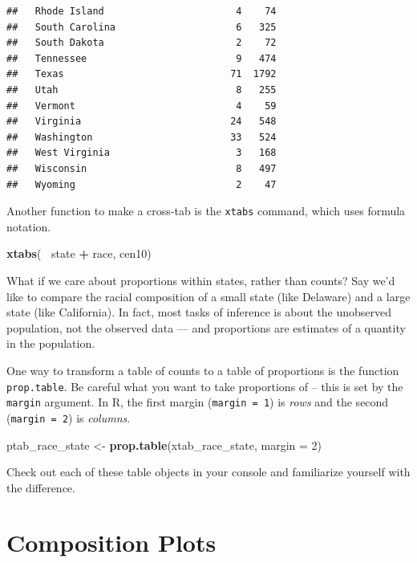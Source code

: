 \documentclass[]{book}
\newenvironment{Shaded}{\begin{snugshade}}{\end{snugshade}}
\newcommand{\DataTypeTok}[1]{\textcolor[rgb]{0.13,0.29,0.53}{#1}}
\newcommand{\DecValTok}[1]{\textcolor[rgb]{0.00,0.00,0.81}{#1}}
\newcommand{\KeywordTok}[1]{\textcolor[rgb]{0.13,0.29,0.53}{\textbf{#1}}}
\newcommand{\NormalTok}[1]{#1}
\newcommand{\OperatorTok}[1]{\textcolor[rgb]{0.81,0.36,0.00}{\textbf{#1}}}
\newcommand{\StringTok}[1]{\textcolor[rgb]{0.31,0.60,0.02}{#1}}
\theoremstyle{definition}
\theoremstyle{definition}
\theoremstyle{definition}
\theoremstyle{remark}
\begin{document}
\begin{Shaded}
\begin{Highlighting}[]
\begin{Shaded}
\begin{Highlighting}[]
\begin{verbatim}
##   Rhode Island                       4    74
##   South Carolina                     6   325
##   South Dakota                       2    72
##   Tennessee                          9   474
##   Texas                             71  1792
##   Utah                               8   255
##   Vermont                            4    59
##   Virginia                          24   548
##   Washington                        33   524
##   West Virginia                      3   168
##   Wisconsin                          8   497
##   Wyoming                            2    47
\end{verbatim}

Another function to make a cross-tab is the \texttt{xtabs} command, which uses formula notation.

\begin{Shaded}
\begin{Highlighting}[]
\KeywordTok{xtabs}\NormalTok{(}\OperatorTok{~}\StringTok{ }\NormalTok{state }\OperatorTok{+}\StringTok{ }\NormalTok{race, cen10)}
\end{Highlighting}
\end{Shaded}

What if we care about proportions within states, rather than counts? Say we'd like to compare the racial composition of a small state (like Delaware) and a large state (like California). In fact, most tasks of inference is about the unobserved population, not the observed data --- and proportions are estimates of a quantity in the population.

One way to transform a table of counts to a table of proportions is the function \texttt{prop.table}. Be careful what you want to take proportions of -- this is set by the \texttt{margin} argument. In R, the first margin (\texttt{margin\ =\ 1}) is \emph{rows} and the second (\texttt{margin\ =\ 2}) is \emph{columns}.

\begin{Shaded}
\begin{Highlighting}[]
\NormalTok{ptab_race_state <-}\StringTok{ }\KeywordTok{prop.table}\NormalTok{(xtab_race_state, }\DataTypeTok{margin =} \DecValTok{2}\NormalTok{)}
\end{Highlighting}
\end{Shaded}

Check out each of these table objects in your console and familiarize yourself with the difference.

\hypertarget{composition-plots}{%
\section{Composition Plots}\label{composition-plots}}


\end{Highlighting}
\end{Shaded}
\end{Highlighting}
\end{Shaded}
\end{document}

